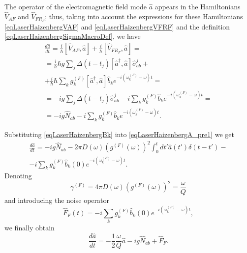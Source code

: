 The operator of the electromagnetic field mode $\hat{a}$ appears in
the Hamiltonians $\hat{V}_{AF}$ and $\hat{V}_{FR_F}$; thus, taking into account the expressions for these Hamiltonians \eqref{eqLaserHaizenbergVAF} and 
\eqref{eqLaserHaizenbergVFRF} and the definition
\eqref{eqLaserHaizenbergSigmaMacroDef}, we have 
\begin{eqnarray}
\frac{d \hat{a}}{d t} = \frac{i}{\hbar}
\left[\hat{V}_{AF}, \hat{a}\right] + 
\frac{i}{\hbar}
\left[\hat{V}_{FR_F}, \hat{a}\right] = 
\nonumber \\
= \frac{i}{\hbar}\hbar g
\sum_j
\Delta\left(t - t_j\right) 
\left[\hat{a}^{\dag},\hat{a}\right]\hat{\sigma}^{j}_{ab} +
\nonumber \\
+ 
\frac{i}{\hbar}\hbar
\sum_k
g_k^{(F)}
\left[\hat{a}^{\dag},\hat{a}\right]\hat{b}_k e^{-i\left(\omega_k^{(F)} -
  \omega\right)t} = 
\nonumber \\
= -i g 
\sum_j
\Delta\left(t - t_j\right) \hat{\sigma}^{j}_{ab} -
i \sum_k
g_k^{(F)}\hat{b}_k e^{-i\left(\omega_k^{(F)} -
  \omega\right)t} =
\nonumber \\ 
= -i g \hat{N}_{ab} -
i \sum_k
g_k^{(F)}\hat{b}_k e^{-i\left(\omega_k^{(F)} -
  \omega\right)t}.
\label{eqLaserHaizenbergA_pre1}
\end{eqnarray}

Substituting \eqref{eqLaserHaizenbergBk} into
\eqref{eqLaserHaizenbergA_pre1} we get
\begin{eqnarray}
\frac{d \hat{a}}{d t} = 
-i g \hat{N}_{ab}
- 2 \pi
D\left(\omega\right) \left(g^{(F)}\left(\omega\right)\right)^2
\int_0^td t' \hat{a}\left(t'\right)\delta\left(t - t'\right) - 
\nonumber \\
-
i
\sum_k
g_k^{(F)}\hat{b}_k \left(0\right)e^{-i\left(\omega_k^{(F)} -
  \omega\right)t}.
\nonumber
\end{eqnarray}
Denoting 
\[
\gamma^{(F)} = 4 \pi
D\left(\omega\right) \left(g^{(F)}\left(\omega\right)\right)^2 = \frac{\omega}{Q}
\]
and introducing the noise operator
\begin{equation}
\hat{F}_F\left(t\right) = - i
\sum_k
g_k^{(F)}\hat{b}_k \left(0\right)e^{-i\left(\omega_k^{(F)} -
  \omega\right)t},
\label{eqLaserHaizenbergFF}
\end{equation}
we finally obtain
\begin{equation}
\frac{d \hat{a}}{d t} = 
- \frac{1}{2}\frac{\omega}{Q}\hat{a}
-i g \hat{N}_{ab} + 
\hat{F}_F.
\label{eqLaserHaizenbergA}
\end{equation}

